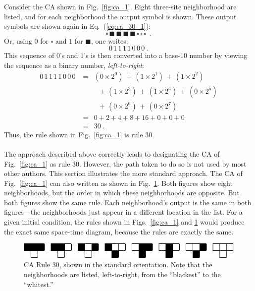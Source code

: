 \documentclass[12pt]{article}
\begin{document}
Consider the CA shown in Fig.~\ref{fig:ca_1}.  Eight
three-site neighborhood are listed, and for each neighborhood the
output symbol is shown.  These output symbols are shown again in
Eq.~(\ref{eq:ca_30_1}): 
\begin{equation}
\label{eq:ca_30_1}
  \square \, \blacksquare \, \blacksquare \, \blacksquare \,
  \blacksquare \, \square \,\square \, \square \;\;. 
\end{equation}
Or, using $0$ for $\square$ and $1$ for $\blacksquare$, one writes:
\begin{equation}
 0 \, 1\, 1\, 1\, 1\, 0\, 0\, 0\;.
\end{equation}
This sequence of $0$'s and $1$'s is then converted into a base-$10$
number by viewing the sequence as a binary number,
\emph{left-to-right}:
\begin{eqnarray}
 0 \, 1\, 1\, 1\, 1\, 0\, 0\, 0\; &=& (0 \times 2^0) \, + \, 
    (1 \times 2^1) \, + \, (1 \times 2^2) \nonumber \\
& & \;\;+ \, (1 \times 2^3) \, + \, (1 \times 2^4) \, + \, (0 \times
 2^5) \nonumber \\
&   & \;\; + \, (0 \times 2^6) \, + \, (0 \times 2^7) \\
& = & 0 + 2 + 4 + 8 + 16 + 0 + 0 + 0 \\
& = & 30 \;.
\end{eqnarray}
Thus, the rule shown in Fig.~\ref{fig:ca_1} is rule 30. \\


\\

The approach described above correctly leads to designating the CA of
Fig.~\ref{fig:ca_1} as rule 30.  However, the path taken to do so is
not used by most other authors.  This section illustrates the more
standard approach.  The CA of Fig.~\ref{fig:ca_1} can also written as
shown in Fig.~\ref{fig:ca_2}.  Both figures show eight neighborhoods,
but the order in which these neighborhoods are opposite.  But both
figures show the same rule.  Each neighborhood's output is the same in
both figures---the neighborhoods just appear in a different location
in the list.  For a given initial condition, the rules shown in
Figs.~\ref{fig:ca_1} and \ref{fig:ca_2} would produce the exact same
space-time diagram, because the rules are exactly the same. 

\begin{figure}[h]
\begin{center}
\vspace{3mm}
\includegraphics[width=120mm]{./ca_30_standard.png}
\caption{CA Rule 30, shown in the standard orientation.  Note that the
  neighborhoods are listed, left-to-right, from the ``blackest'' to the
``whitest.''}
 \label{fig:ca_2}
\vspace{0mm}
\end{center}
\end{figure}
\end{document}
